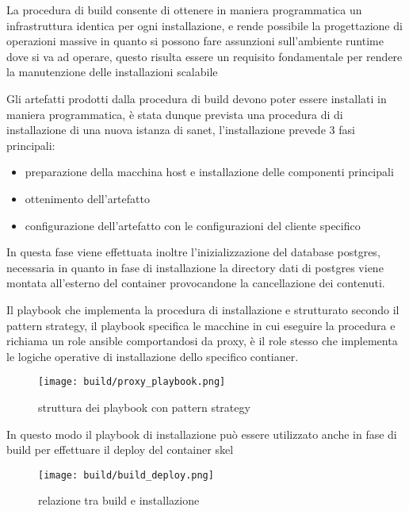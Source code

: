 La procedura di build consente di ottenere in maniera programmatica un infrastruttura identica per ogni installazione, e rende possibile la progettazione di operazioni massive in quanto si possono fare assunzioni sull'ambiente runtime dove si va ad operare, questo risulta essere un requisito fondamentale per rendere la manutenzione delle installazioni scalabile

Gli artefatti prodotti dalla procedura di build devono poter essere installati in maniera programmatica, è stata dunque prevista una procedura di di installazione di una nuova istanza di sanet, l'installazione prevede 3 fasi principali:

\begin{itemize}
  \item{preparazione della macchina host e installazione delle componenti principali}
  \item{ottenimento dell'artefatto}
  \item{configurazione dell'artefatto con le configurazioni del cliente specifico}
\end{itemize}

In questa fase viene effettuata inoltre l'inizializzazione del database postgres, necessaria in quanto in fase di installazione la directory dati di postgres viene montata all'esterno del container provocandone la cancellazione dei contenuti.

Il playbook che implementa la procedura di installazione e strutturato secondo il pattern strategy, il playbook specifica le macchine in cui eseguire la procedura e richiama un role ansible comportandosi da proxy, è il role stesso che implementa le logiche operative di installazione dello specifico contianer.

\begin{figure}[H]
    \centering
    \texttt{[image: build/proxy\_playbook.png]}
    \caption{struttura dei playbook con pattern strategy}
    \label{fig:proxy_playbook}
\end{figure}

In questo modo il playbook di installazione può essere utilizzato anche in fase di build per effettuare il deploy del container skel

\begin{figure}[H]
    \centering
    \texttt{[image: build/build\_deploy.png]}
    \caption{relazione tra build e installazione}
    \label{fig:build_deploy}
\end{figure}

